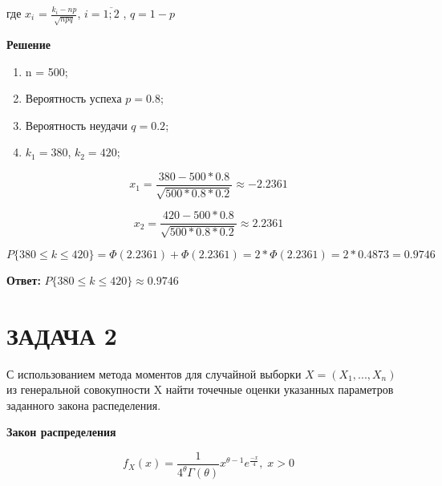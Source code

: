 \documentclass[12pt, a4paper]{report}
\begin{document}
	где $x_i$ = $\frac{k_i - np}{\sqrt{npq}}$, $i = \overline{1;2}$ , $q = 1 - p$
	
	
	\vspace{0.2cm}
	\textbf{Решение}
	
	\begin{enumerate}
		\item n = 500;
		\item Вероятность успеха $p = 0.8$;
		\item Вероятность неудачи $q = 0.2$;
		\item $k_1 = 380$, $k_2 = 420$;
	\end{enumerate}
	
	\vspace{0.5cm}
	
	\begin{equation*}
	x_1 = \frac{380 - 500 * 0.8}{\sqrt{500 * 0.8 * 0.2}} \approx -2.2361
	\end{equation*}
	
	\vspace{0.2cm}
	\begin{equation*}
	x_2 = \frac{420 - 500 * 0.8}{\sqrt{500 * 0.8 * 0.2}} \approx 2.2361
	\end{equation*}
	
	\vspace{0.7cm}
	
	\begin{equation*}
	P\{ 380 \le k \le 420 \} = \Phi(2.2361) + \Phi(2.2361) = 2*\Phi(2.2361) =  2 * 0.4873 = 0.9746
	\end{equation*}
	
	\vspace{0.5cm}
	\textbf{Ответ:}
	$P\{ 380 \le k \le 420 \} \approx 0.9746$
	
	
	
	
	
	
	\newpage
	
	\section{ЗАДАЧА 2}
	
	\hspace{1cm}
	С использованием метода моментов для случайной выборки $X = (X_1, ..., X_n)$ из генеральной совокупности X найти точечные оценки указанных параметров заданного закона распеделения.
	
	
	\vspace{0.5cm}
	\textbf{Закон распределения}
	
	\begin{equation*} 
	f_X(x) = \frac{1}{4^\theta \Gamma(\theta)}  x^{\theta - 1} e^{\frac{-x}{4}}, \;  x > 0
	\end{equation*}
	
\end{document}
